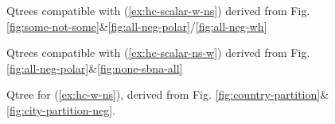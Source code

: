 		\begin{figure}[H]
			\centering
			\caption{Qtrees compatible with (\ref{ex:hc-scalar-w-ns}) derived from Fig. \ref{fig:some-not-some}\&\ref{fig:all-neg-polar}/\ref{fig:all-neg-wh}}\label{fig:if-some-then-not-all}%
		\end{figure}

		\begin{figure}[H]
			\centering
			\caption{Qtrees compatible with (\ref{ex:hc-scalar-ns-w}) derived from Fig. \ref{fig:all-neg-polar}\&\ref{fig:none-sbna-all}}\label{fig:if-not-all-then-some}%
		\end{figure}

		\begin{figure}[H]
			\centering
			\caption{Qtree for (\ref{ex:hc-w-ns}), derived from Fig. \ref{fig:country-partition}\&\ref{fig:city-partition-neg}.}\label{fig:hc-non-scalar-w-ns}
		\end{figure}
	
